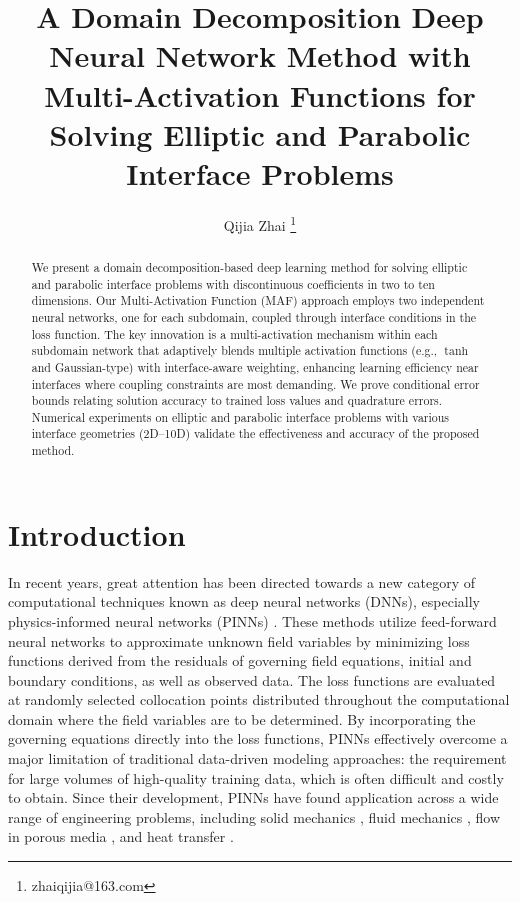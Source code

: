 \documentclass{article}
\title{A Domain Decomposition Deep Neural Network Method with Multi-Activation Functions for Solving Elliptic and Parabolic Interface Problems}
\author[a]{Qijia Zhai \thanks{zhaiqijia@163.com}}
\affil[a]{School of Mathematics, Sichuan University, Chengdu 610064, China}
\begin{document}
\maketitle

\begin{abstract}
We present a domain decomposition-based deep learning method for solving elliptic and parabolic interface problems with discontinuous coefficients in two to ten dimensions. Our Multi-Activation Function (MAF) approach employs two independent neural networks, one for each subdomain, coupled through interface conditions in the loss function. The key innovation is a multi-activation mechanism within each subdomain network that adaptively blends multiple activation functions (e.g., $\tanh$ and Gaussian-type) with interface-aware weighting, enhancing learning efficiency near interfaces where coupling constraints are most demanding. We prove conditional error bounds relating solution accuracy to trained loss values and quadrature errors. Numerical experiments on elliptic and parabolic interface problems with various interface geometries (2D--10D) validate the effectiveness and accuracy of the proposed method.
\end{abstract}

\section{Introduction}

In recent years, great attention has been directed towards a new category of computational techniques known as deep neural networks (DNNs), especially physics-informed neural networks (PINNs) \cite{raissi2019physics, cuomo2022scientific}. These methods utilize feed-forward neural networks to approximate unknown field variables by minimizing loss functions derived from the residuals of governing field equations, initial and boundary conditions, as well as observed data. The loss functions are evaluated at randomly selected collocation points distributed throughout the computational domain where the field variables are to be determined. By incorporating the governing equations directly into the loss functions, PINNs effectively overcome a major limitation of traditional data-driven modeling approaches: the requirement for large volumes of high-quality training data, which is often difficult and costly to obtain. Since their development, PINNs have found application across a wide range of engineering problems, including solid mechanics \cite{haghighat2020deep, haghighat2021physics, bai2023physics}, fluid mechanics \cite{cai2021physics, mao2020physics, zhang2024priori}, flow in porous media \cite{almajid2022prediction, fraces2021physics, zhang2023physics}, and heat transfer \cite{cai2021physicsheat}.
\end{document}
